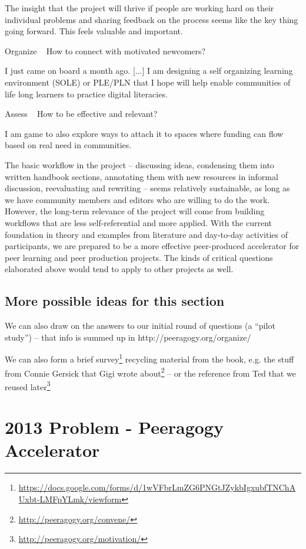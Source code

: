 \documentclass{acm_proc_article-sp}
\begin{document}
        The insight that the project will thrive if people are working hard on their individual problems and sharing feedback on the process seems like the key thing going forward. This feels valuable and important.

    Organize ~ How to connect with motivated newcomers?

        I just came on board a month ago. [...] I am designing a self organizing learning environment (SOLE) or PLE/PLN that I hope will help enable communities of life long learners to practice digital literacies.

    Assess ~ How to be effective and relevant?

        I am game to also explore ways to attach it to spaces where funding can flow based on real need in communities.

The basic workflow in the project -- discussing ideas, condensing them into written handbook sections, annotating them with new resources in informal discussion, reevaluating and rewriting -- seems relatively sustainable, as long as we have community members and editors who are willing to do the work. However, the long-term relevance of the project will come from building workflows that are less self-referential and more applied. With the current foundation in theory and examples from literature and day-to-day activities of participants, we are prepared to be a more effective peer-produced accelerator for peer learning and peer production projects. The kinds of critical questions elaborated above would tend to apply to other projects as well.

\subsection{More possible ideas for this section}

We can also draw on the answers to our initial round of questions (a ``pilot study'') -- that info is summed up in http://peeragogy.org/organize/

We can also form a brief survey\footnote{\url{https://docs.google.com/forms/d/1wVFbrLmZG6PNGtJZykbIgxubfTNChAUxbt-LMFpYLmk/viewform}} recycling material from the book, e.g. the stuff from Connie Gersick that Gigi wrote about\footnote{\url{http://peeragogy.org/convene/}} -- or the reference from Ted that we reused later\footnote{\url{http://peeragogy.org/motivation/}}

%
%
%
%

\section{2013 Problem - Peeragogy Accelerator}
\end{document}

